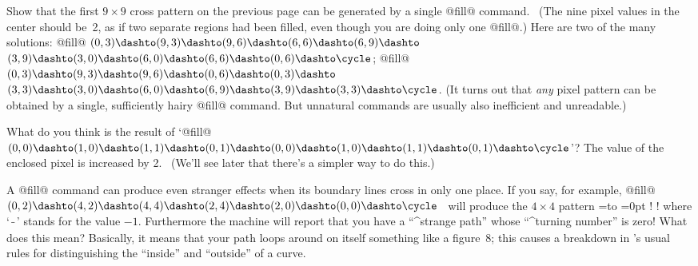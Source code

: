 {{{{\exercise Show that the first $9\times9$ cross pattern on the previous
page can be generated by a single @fill@ command. \ (The nine pixel
values in the center should be~2, as if two separate regions had been
filled, even though you are doing only one @fill@.)
\answer Here are two of the many solutions:
\begindisplay
@fill@ $(0,3)\dashto(9,3)\dashto(9,6)\dashto(6,6)\dashto(6,9)\dashto$\cr
\indent $(3,9)\dashto(3,0)\dashto(6,0)\dashto(6,6)\dashto(0,6)\dashto\cycle$;\cr
@fill@ $(0,3)\dashto(9,3)\dashto(9,6)\dashto(0,6)\dashto(0,3)\dashto$\cr
\indent $(3,3)\dashto(3,0)\dashto(6,0)\dashto(6,9)\dashto(3,9)\dashto
  (3,3)\dashto\cycle$.\cr
\enddisplay
(It turns out that {\sl any\/} pixel pattern can be obtained by a single,
sufficiently hairy @fill@ command. But unnatural commands are usually also
inefficient and unreadable.)

\exercise What do you think is the result of `@fill@ $(0,0)\dashto(1,0)\dashto
(1,1)\dashto(0,1)\dashto(0,0)\dashto(1,0)\dashto(1,1)\dashto(0,1)\dashto
\cycle$'\thinspace?
\answer The value of the enclosed pixel is increased by 2. \ (We'll see later
that there's a simpler way to do this.)

A @fill@ command can produce even stranger effects when its boundary lines
cross in only one place. If you say, for example,
\begindisplay
@fill@ $(0,2)\dashto(4,2)\dashto(4,4)\dashto(2,4)\dashto(2,0)
 \dashto(0,0)\dashto\cycle$
\enddisplay
\MF\ will produce the $4\times4$ pattern
=\hbox to
=0pt
\cr
! \cr
! \cr
\enddisplay
where `$\hbox to3pt{}\over$' stands for the value $-1$. Furthermore the
machine will report that you have a ``^{strange path}'' whose ``^{turning
number}'' is zero!  What does this mean? Basically, it means that your
path loops around on itself something like a figure~8; this causes a
breakdown in \MF's usual rules for distinguishing the ``inside'' and
``outside'' of a curve.

}}}}
